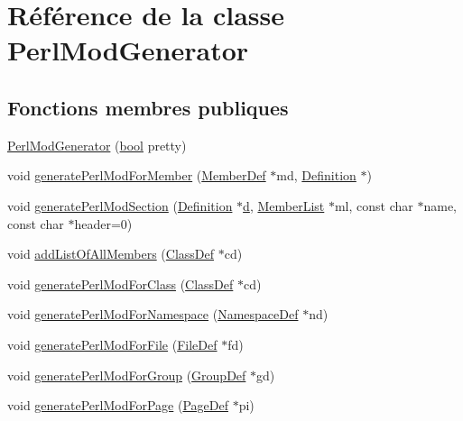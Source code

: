 \hypertarget{class_perl_mod_generator}{}\section{Référence de la classe Perl\+Mod\+Generator}
\label{class_perl_mod_generator}
\subsection*{Fonctions membres publiques}
\begin{DoxyCompactItemize}
\item 
\hyperlink{class_perl_mod_generator_a7473195622dcb57930bbd08c88dd6504}{Perl\+Mod\+Generator} (\hyperlink{qglobal_8h_a1062901a7428fdd9c7f180f5e01ea056}{bool} pretty)
\item 
void \hyperlink{class_perl_mod_generator_a3d4ede2123b22d069fceb46ced7849fc}{generate\+Perl\+Mod\+For\+Member} (\hyperlink{class_member_def}{Member\+Def} $\ast$md, \hyperlink{class_definition}{Definition} $\ast$)
\item 
void \hyperlink{class_perl_mod_generator_ae6915400c241f3dc0727f428e16220dc}{generate\+Perl\+Mod\+Section} (\hyperlink{class_definition}{Definition} $\ast$\hyperlink{060__command__switch_8tcl_af43f4b1f0064a33b2d662af9f06d3a00}{d}, \hyperlink{class_member_list}{Member\+List} $\ast$ml, const char $\ast$name, const char $\ast$header=0)
\item 
void \hyperlink{class_perl_mod_generator_abd4c61f5193f086693ff35917dff5c31}{add\+List\+Of\+All\+Members} (\hyperlink{class_class_def}{Class\+Def} $\ast$cd)
\item 
void \hyperlink{class_perl_mod_generator_a1540264b33a68abcf8ec9964cc396fbf}{generate\+Perl\+Mod\+For\+Class} (\hyperlink{class_class_def}{Class\+Def} $\ast$cd)
\item 
void \hyperlink{class_perl_mod_generator_aaca0167b0044699d857a1ee642072485}{generate\+Perl\+Mod\+For\+Namespace} (\hyperlink{class_namespace_def}{Namespace\+Def} $\ast$nd)
\item 
void \hyperlink{class_perl_mod_generator_a306916cfc7ba295e17252c610f1c8c93}{generate\+Perl\+Mod\+For\+File} (\hyperlink{class_file_def}{File\+Def} $\ast$fd)
\item 
void \hyperlink{class_perl_mod_generator_ac7fae8c1ec373e6a654ccecc8364d721}{generate\+Perl\+Mod\+For\+Group} (\hyperlink{class_group_def}{Group\+Def} $\ast$gd)
\item 
void \hyperlink{class_perl_mod_generator_a0151a88e0794af12a9e7932de2d7a928}{generate\+Perl\+Mod\+For\+Page} (\hyperlink{class_page_def}{Page\+Def} $\ast$pi)

\end{DoxyCompactItemize}
